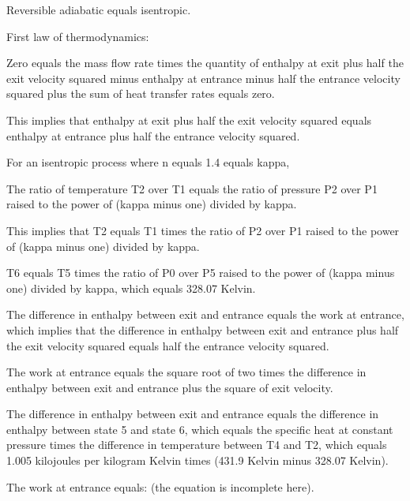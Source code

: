 Reversible adiabatic equals isentropic.

First law of thermodynamics:

Zero equals the mass flow rate times the quantity of enthalpy at exit plus half the exit velocity squared minus enthalpy at entrance minus half the entrance velocity squared plus the sum of heat transfer rates equals zero.

This implies that enthalpy at exit plus half the exit velocity squared equals enthalpy at entrance plus half the entrance velocity squared.

For an isentropic process where n equals 1.4 equals kappa,

The ratio of temperature T2 over T1 equals the ratio of pressure P2 over P1 raised to the power of (kappa minus one) divided by kappa.

This implies that T2 equals T1 times the ratio of P2 over P1 raised to the power of (kappa minus one) divided by kappa.

T6 equals T5 times the ratio of P0 over P5 raised to the power of (kappa minus one) divided by kappa, which equals 328.07 Kelvin.

The difference in enthalpy between exit and entrance equals the work at entrance, which implies that the difference in enthalpy between exit and entrance plus half the exit velocity squared equals half the entrance velocity squared.

The work at entrance equals the square root of two times the difference in enthalpy between exit and entrance plus the square of exit velocity.

The difference in enthalpy between exit and entrance equals the difference in enthalpy between state 5 and state 6, which equals the specific heat at constant pressure times the difference in temperature between T4 and T2, which equals 1.005 kilojoules per kilogram Kelvin times (431.9 Kelvin minus 328.07 Kelvin).

The work at entrance equals: (the equation is incomplete here).